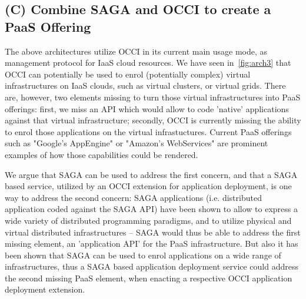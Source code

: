 \documentclass[10pt,conference,final,letterpaper,twoside,twocolumn,]{IEEEtran}
\begin{document}
 \subsection{(C) Combine SAGA and OCCI to create a PaaS Offering}

 The above architectures utilize OCCI in its current main usage mode,
 as management protocol for IaaS cloud resources.  We have seen
 in~\ref{fig:arch3} that OCCI can potentially be used to enrol
 (potentially complex) virtual infrastructures on IaaS clouds, such as
 virtual clusters, or virtual grids.  There are, however, two elements
 missing to turn those virtual infrastructures into PaaS offerings:
 first, we miss an API which would allow to code 'native' applications
 against that virtual infrastructure; secondly, OCCI is currently
 missing the ability to enrol those applications on the virtual
 infrastuctures.  Current PaaS offerings such as "Google's AppEngine"
 or "Amazon's WebServices" are prominent examples of how those
 capabilities could be rendered.

 We argue that SAGA can be used to address the first concern, and that
 a SAGA based service, utilized by an OCCI extension for application
 deployment, is one way to address the second concern: SAGA
 applications (i.e. distributed application coded against the SAGA
 API) have been shown to allow to express a wide variety of
 distributed programming paradigms, and to utilize physical and
 virtual distributed infrastructures -- SAGA would thus be able to
 address the first missing element, an 'application API' for the PaaS
 infrastructure.  But also it has been shown that SAGA can be used to
 enrol applications on a wide range of infrastructures, thus a SAGA
 based application deployment service could address the second missing
 PaaS element, when enacting a respective OCCI application deployment
 extension.
\end{document}
